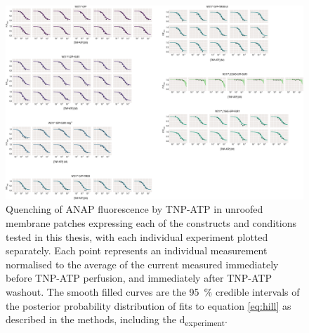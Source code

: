 \begin{figure}[h]
	\centering
	\includegraphics[width=\textwidth]{all_unroofed_fits_2.pdf}
	\caption[Unroofed membrane quenching sample hill fits]{
	Quenching of ANAP fluorescence by TNP-ATP in unroofed membrane patches expressing each of the constructs and conditions tested in this thesis, with each individual experiment plotted separately.
	Each point represents an individual measurement normalised to the average of the current measured immediately before TNP-ATP perfusion, and immediately after TNP-ATP washout.
	The smooth filled curves are the \SI{95}{\percent} credible intervals of the posterior probability distribution of fits to equation \ref{eq:hill} as described in the methods, including the \textgreek{d}\textsubscript{experiment}.
	}
	\label{apxfig:unroofed_2}
\end{figure}

